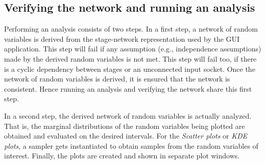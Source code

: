 \subsection{Verifying the network and running an analysis}
Performing an analysis consists of two steps. In a first step, a network of random variables is derived from the stage-network representation used by the GUI application. This step will fail if any assumption (e.g., independence assumptions) made by the derived random variables is not met. This step will fail too, if there is a cyclic dependency between stages or an unconnected input socket. Once the network of random variables is derived, it is ensured that the network is consistent. Hence running an analysis and verifying the network share this first step. 

In a second step, the derived network of random variables is actually analyzed. That is, the marginal distributions of the random variables being plotted are obtained and evaluated on the desired intervals. For the \emph{Scatter plots} or \emph{KDE plots}, a sampler gets instantiated to obtain samples from the random variables of interest. Finally, the plots are created and shown in separate plot windows.